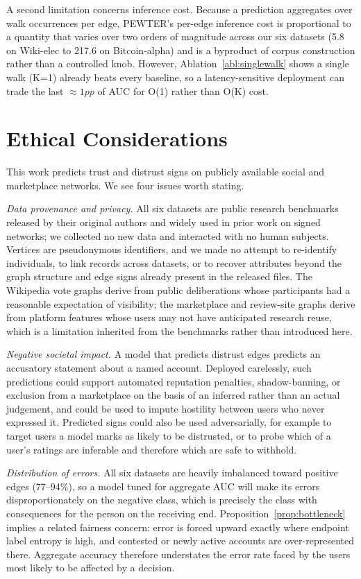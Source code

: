 \documentclass[sigconf]{acmart}
\theoremstyle{plain}
\theoremstyle{definition}
\begin{document}
A second limitation concerns inference cost. Because a prediction aggregates over 
walk occurrences per edge, PEWTER's per-edge inference cost is proportional to a quantity that varies over two orders of magnitude across our six datasets (5.8 on Wiki-elec to 217.6 on Bitcoin-alpha) and is a byproduct of corpus construction rather than a controlled knob. However, Ablation~\ref{abl:singlewalk} shows a single walk (K=1) already beats every baseline, so a latency-sensitive deployment can trade the last $\approx1pp$ of AUC for O(1) rather than O(K) cost.
\section*{Ethical Considerations}
This work predicts trust and distrust signs on publicly available social and marketplace networks. We see four issues worth stating.

\emph{Data provenance and privacy.} All six datasets are public research benchmarks released by their original authors and widely used in prior work on signed networks; we collected no new data and interacted with no human subjects. Vertices are pseudonymous identifiers, and we made no attempt to re-identify individuals, to link records across datasets, or to recover attributes beyond the graph structure and edge signs already present in the released files. The Wikipedia vote graphs derive from public deliberations whose participants had a reasonable expectation of visibility; the marketplace and review-site graphs derive from platform features whose users may not have anticipated research reuse, which is a limitation inherited from the benchmarks rather than introduced here.

\emph{Negative societal impact.} A model that predicts distrust edges predicts an accusatory statement about a named account. Deployed carelessly, such predictions could support automated reputation penalties, shadow-banning, or exclusion from a marketplace on the basis of an inferred rather than an actual judgement, and could be used to impute hostility between users who never expressed it. Predicted signs could also be used adversarially, for example to target users a model marks as likely to be distrusted, or to probe which of a user's ratings are inferable and therefore which are safe to withhold.

\emph{Distribution of errors.} All six datasets are heavily imbalanced toward positive edges (77--94\%), so a model tuned for aggregate AUC will make its errors disproportionately on the negative class, which is precisely the class with consequences for the person on the receiving end. Proposition~\ref{prop:bottleneck} implies a related fairness concern: error is forced upward exactly where endpoint label entropy is high, and contested or newly active accounts are over-represented there. Aggregate accuracy therefore understates the error rate faced by the users most likely to be affected by a decision.
\end{document}
